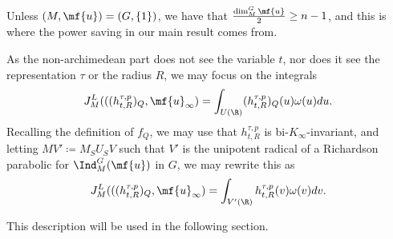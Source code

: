 \begin{rmk}
    Unless $(M,\mf{u})=(G,\lbrace 1\rbrace)$, we have that $\frac{\dim^G_M \mf{u}}{2}\geq n-1$, and this is where the power saving in our main result comes from.
\end{rmk}
\noindent As the non-archimedean part does not see the variable $t$, nor does it see the representation $\tau$ or the radius $R$, we may focus on the integrals
\begin{align}\label{inforbitcrude}
    J^{L}_M(((h^{\tau,p}_{t,R})_Q,\mf{u}_\infty) = \int_{U(\R)}(h^{\tau,p}_{t,R})_Q(u)\omega(u) du.
\end{align}
Recalling the definition of $f_Q$, we may use that $h^{\tau,p}_{t,R}$ is bi-$K_\infty$-invariant, and letting $MV'\coloneqq M_SU_SV$ such that $V'$ is the unipotent radical of a Richardson parabolic for $\Ind_M^G(\mf{u})$ in $G$, we may rewrite this as
\begin{align}\label{inforbit}
    J^{L}_M(((h^{\tau,p}_{t,R})_Q,\mf{u}_\infty) = \int_{V'(\R)}h^{\tau,p}_{t,R}(v)\omega(v) dv.
\end{align}

\noindent This description will be used in the following section.



